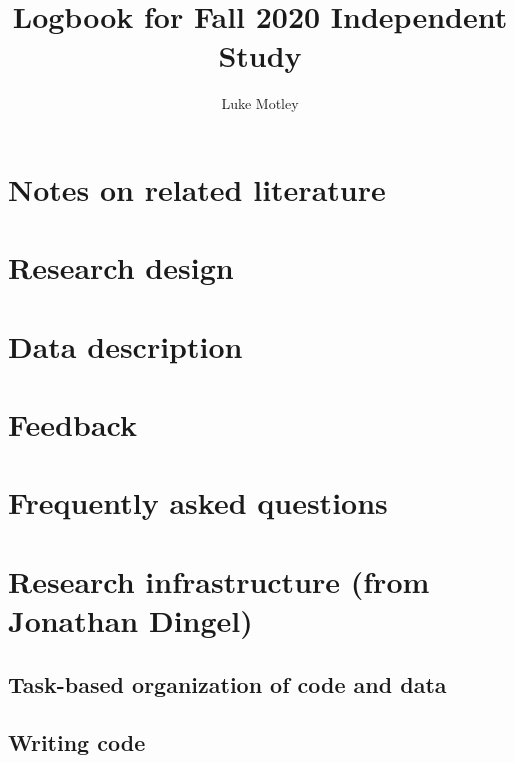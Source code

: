 \documentclass{report}
\title{Logbook for Fall 2020 Independent Study}
\author{
Luke Motley
}
\date{}
\numberwithin{equation}{section}
\numberwithin{figure}{section}
\numberwithin{table}{section}
\begin{document}
\maketitle

\renewcommand{\thechapter}{\Alph{chapter}}
\setcounter{tocdepth}{2}
\tableofcontents
\etocsettocstyle{}{} %

\chapter{Notes on related literature}

\chapter{Research design}

\chapter{Data description}


\chapter{Feedback}


\chapter{Frequently asked questions}




\chapter{Research infrastructure (from Jonathan Dingel)}


\section{Task-based organization of code and data} 
\section{Writing code} 
\end{document}
